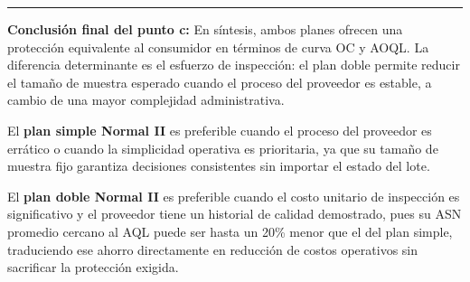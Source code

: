 \documentclass[
  12pt,
]{article}
\begin{document}
\begin{table}[!h]
\centering
\caption{\label{tab:tabla comparativa c}Comparación del mejor plan simple vs. el mejor plan doble (Normal Nivel II)}
\centering
{}
\end{table}

\begin{center}\rule{0.5\linewidth}{0.5pt}\end{center}

\textbf{Conclusión final del punto c:} En síntesis, ambos planes ofrecen
una protección equivalente al consumidor en términos de curva OC y AOQL.
La diferencia determinante es el esfuerzo de inspección: el plan doble
permite reducir el tamaño de muestra esperado cuando el proceso del
proveedor es estable, a cambio de una mayor complejidad administrativa.

El \textbf{plan simple Normal II} es preferible cuando el proceso del
proveedor es errático o cuando la simplicidad operativa es prioritaria,
ya que su tamaño de muestra fijo garantiza decisiones consistentes sin
importar el estado del lote.

El \textbf{plan doble Normal II} es preferible cuando el costo unitario
de inspección es significativo y el proveedor tiene un historial de
calidad demostrado, pues su ASN promedio cercano al AQL puede ser hasta
un 20\% menor que el del plan simple, traduciendo ese ahorro
directamente en reducción de costos operativos sin sacrificar la
protección exigida.
\end{document}
